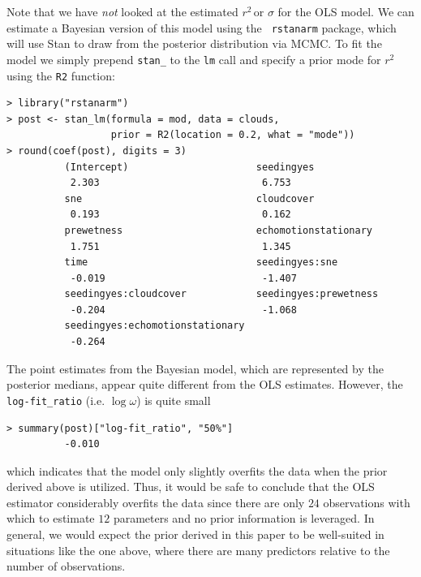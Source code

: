 \documentclass[11pt]{article}
\newcommand{\Rsq}{$r^2\,$}
\begin{document}
Note that we have \emph{not} looked at the estimated \Rsq or $\sigma$ for the
OLS model. We can estimate a Bayesian version of this model using the {\tt
rstanarm} package, which will use Stan \cite{stan} to draw from the posterior
distribution via MCMC. To fit the model we simply prepend {\tt stan\_} to the
{\tt lm} call and specify a prior mode for \Rsq using the {\tt R2} function:

\vspace{.5cm}
\begin{lstlisting}[frame=lines]
> library("rstanarm")
> post <- stan_lm(formula = mod, data = clouds,
                  prior = R2(location = 0.2, what = "mode"))
> round(coef(post), digits = 3)
          (Intercept)                      seedingyes
           2.303                            6.753
          sne                              cloudcover
           0.193                            0.162
          prewetness                       echomotionstationary
           1.751                            1.345
          time                             seedingyes:sne
           -0.019                           -1.407
          seedingyes:cloudcover            seedingyes:prewetness
           -0.204                           -1.068
          seedingyes:echomotionstationary
           -0.264
\end{lstlisting}
\vspace{.5cm}


\noindent The point estimates from the Bayesian model, which are represented by
the posterior medians, appear quite different from the OLS estimates. However,
the {\tt log-fit\_ratio} (i.e. $\log{\omega}$) is quite small

\vspace{.5cm}
\begin{lstlisting}[frame=lines]
> summary(post)["log-fit_ratio", "50%"]
          -0.010
\end{lstlisting}
\vspace{.5cm}

\noindent which indicates that the model only slightly overfits the data when
the prior derived above is utilized. Thus, it would be safe to conclude that the
OLS estimator considerably overfits the data since there are only $24$
observations with which to estimate $12$ parameters and no prior information is
leveraged. In general, we would expect the prior derived in this paper to be
well-suited in situations like the one above, where there are many predictors
relative to the number of observations.
\end{document}
